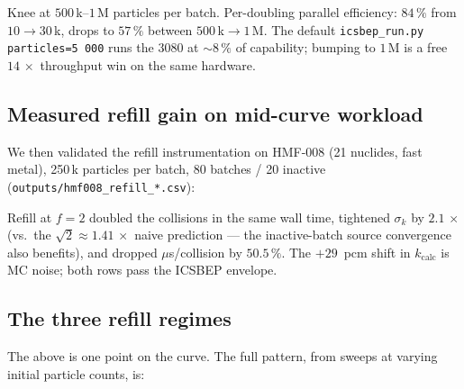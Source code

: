 \noindent
Knee at $500\,$k--$1\,$M particles per batch. Per-doubling
parallel efficiency: $84\,\%$ from $10\to30$\,k, drops to $57\,\%$
between $500\,$k$\to$$1\,$M. The default
\texttt{icsbep\_run.py particles=5\,000} runs the 3080 at
$\sim 8\,\%$ of capability; bumping to $1\,$M is a free
$14\,\times$ throughput win on the same hardware.

\subsection{Measured refill gain on mid-curve workload}

We then validated the refill instrumentation on HMF-008
(21 nuclides, fast metal), 250\,k particles per batch, 80 batches
/ 20 inactive (\texttt{outputs/hmf008\_refill\_*.csv}):

\noindent{}

\noindent
Refill at $f=2$ doubled the collisions in the same wall time,
tightened $\sigma_k$ by $2.1\,\times$ (vs.\ the
$\sqrt{2}\approx 1.41\,\times$ naive prediction --- the
inactive-batch source convergence also benefits), and dropped
$\mu$s/collision by $50.5\,\%$. The $+29$~pcm shift in
$k_\text{calc}$ is MC noise; both rows pass the ICSBEP envelope.

\subsection{The three refill regimes}

The above is one point on the curve. The full pattern, from
sweeps at varying initial particle counts, is:

